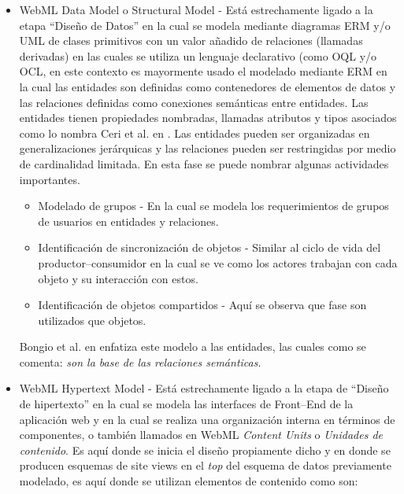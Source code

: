 \documentclass[oneside,12pt,a4paper]{memoir}%
\begin{document}
	\begin{itemize}
	  \item \ac{WebML} Data Model o Structural Model - Est\'a
	  estrechamente ligado a la etapa ``Dise\~no de Datos'' en la cual se modela
	  mediante diagramas \ac{ERM} y/o \ac{UML} de clases primitivos con un valor a\~nadido de
	  relaciones (llamadas derivadas) en las cuales se utiliza un lenguaje
	  declarativo (como \ac{OQL} y/o \ac{OCL}, en este contexto es mayormente usado
	  el modelado mediante \ac{ERM} en la cual las entidades son definidas como
	  contenedores de elementos de datos y las relaciones definidas como conexiones
	  sem\'anticas entre entidades. Las entidades tienen propiedades nombradas,
	  llamadas atributos y tipos asociados como lo nombra Ceri et al. en
	  \cite{Matera2003}.
	  Las entidades pueden ser organizadas en generalizaciones jer\'arquicas y las
	  relaciones pueden ser restringidas por medio de cardinalidad limitada. En
	  esta fase se puede nombrar algunas actividades importantes.		  

	  \begin{itemize}
	    \item Modelado de grupos - En la cual se modela los requerimientos de
	    grupos de usuarios en entidades y relaciones.
	    \item Identificaci\'on de sincronizaci\'on de objetos - Similar al ciclo de
	    vida del productor--consumidor en la cual se ve como los actores
	    trabajan con cada objeto y su interacci\'on con estos.
	    \item Identificaci\'on de objetos compartidos - Aqu\'i se observa que
	    fase son utilizados que objetos.
  	  \end{itemize}
  	  
  	  Bongio et al. en \cite{Ceri2000} enfatiza este modelo a las entidades, las cuales como se
  	  comenta: \textit{son la base de las relaciones sem\'anticas}.

	  \item WebML Hypertext Model - Est\'a estrechamente ligado a la
	  etapa de ``Dise\~no de hipertexto'' en la cual se modela las interfaces de
	  Front--End de la aplicaci\'on web y en la cual se realiza una organizaci\'on
	  interna en t\'erminos de componentes, o tambi\'en llamados en \ac{WebML}
	  \textit{Content Units} o \textit{Unidades de contenido}.
	  Es aqu\'i donde se inicia el dise\~no propiamente dicho y en donde se producen
	  esquemas de site views en el \textit{top} del esquema de datos previamente modelado,
	  es aqu\'i donde se utilizan elementos de contenido como son:
	  

\end{itemize}
\end{document}
